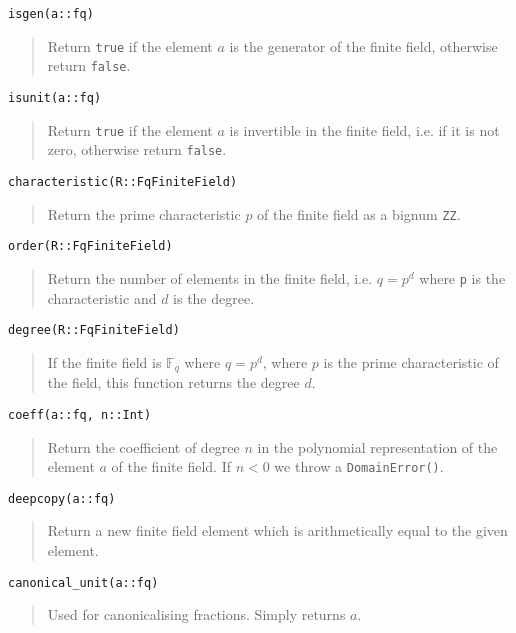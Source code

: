 \documentclass[a4paper,10pt]{article}
\newcommand{\F}{\mathbb{F}}
\newcommand{\code}{\lstinline}
\newcommand{\desc}[1]{\vspace{-3mm}\begin{quote}#1\end{quote}}
\begin{document}
{{\begin{lstlisting}
isgen(a::fq)
\end{lstlisting}

\desc{Return \code{true} if the element $a$ is the generator of the finite field,
otherwise return \code{false}.}

\begin{lstlisting}
isunit(a::fq)
\end{lstlisting}

\desc{Return \code{true} if the element $a$ is invertible in the finite field,
i.e. if it is not zero, otherwise return \code{false}.}

\begin{lstlisting}
characteristic(R::FqFiniteField)
\end{lstlisting}

\desc{Return the prime characteristic $p$ of the finite field as a bignum
\code{ZZ}.}

\begin{lstlisting}
order(R::FqFiniteField)
\end{lstlisting}

\desc{Return the number of elements in the finite field, i.e. $q = p^d$
where \code{p} is the characteristic and $d$ is the degree.}

\begin{lstlisting}
degree(R::FqFiniteField)
\end{lstlisting}

\desc{If the finite field is $\F_q$ where $q = p^d$, where $p$ is the
prime characteristic of the field, this function returns the degree
$d$.}

\begin{lstlisting}
coeff(a::fq, n::Int)
\end{lstlisting}

\desc{Return the coefficient of degree $n$ in the polynomial representation
of the element $a$ of the finite field. If $n < 0$ we throw a
\code{DomainError()}.}

\begin{lstlisting}
deepcopy(a::fq)
\end{lstlisting}

\desc{Return a new finite field element which is arithmetically equal to
the given element.}

\begin{lstlisting}
canonical_unit(a::fq)
\end{lstlisting}

\desc{Used for canonicalising fractions. Simply returns $a$.}

}}
\end{document}
